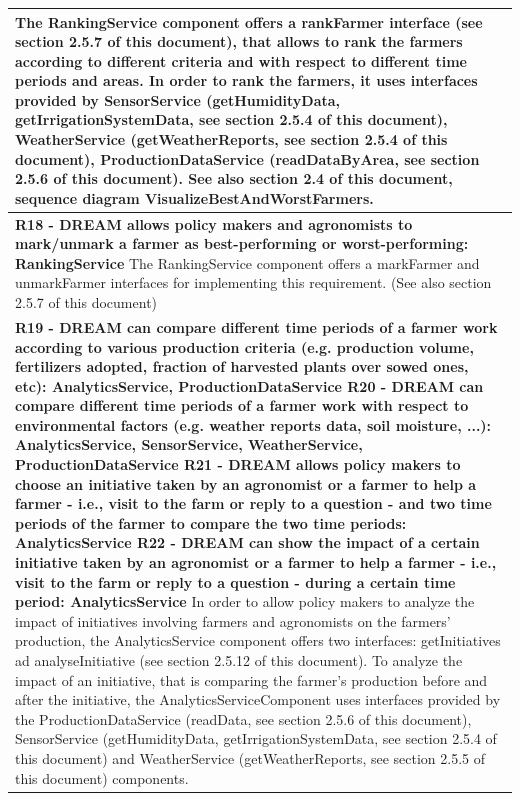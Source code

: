 \documentclass{article}
\begin{document}
\begin{longtable}[c]{|m{11.75cm}|}
    The RankingService component offers a rankFarmer interface (see section 2.5.7 of this document), that allows to rank the farmers according to different criteria and with respect to different time periods and areas. In order to rank the farmers, it uses interfaces provided by SensorService (getHumidityData, getIrrigationSystemData, see section 2.5.4 of this document), WeatherService (getWeatherReports, see section 2.5.4 of this document), ProductionDataService (readDataByArea, see section 2.5.6 of this document). See also section 2.4 of this document, sequence diagram VisualizeBestAndWorstFarmers.
    \\
    \hline
    
    \textbf{R18 - DREAM allows policy makers and agronomists to mark/unmark a farmer as best-performing or worst-performing: RankingService}
    \newline\newline
    The RankingService component offers a markFarmer and unmarkFarmer interfaces for implementing this requirement. (See also section 2.5.7 of this document)\\
    \hline
    
    \textbf{R19 - DREAM can compare different time periods of a farmer work according to various production criteria (e.g. production volume, fertilizers adopted, fraction of harvested plants over sowed ones, etc): AnalyticsService, ProductionDataService
    \newline\newline
    R20 - DREAM can compare different time periods of a farmer work with respect to environmental factors (e.g. weather reports data, soil moisture, ...): AnalyticsService, SensorService, WeatherService, ProductionDataService
    \newline\newline
    R21 - DREAM allows policy makers to choose an initiative taken by an agronomist or a farmer to help a farmer - i.e., visit to the farm or reply to a question - and two time periods of the farmer to compare the two time periods: AnalyticsService
    \newline\newline
    R22 - DREAM can show the impact of a certain initiative taken by an agronomist or a farmer to help a farmer - i.e., visit to the farm or reply to a question - during a certain time period: AnalyticsService
    \newline\newline}
    In order to allow policy makers to analyze the impact of initiatives involving farmers and agronomists on the farmers' production, the AnalyticsService component offers two interfaces: getInitiatives ad analyseInitiative (see section 2.5.12 of this document). To analyze the impact of an initiative, that is comparing the farmer's production before and after the initiative, the AnalyticsServiceComponent uses interfaces provided by the ProductionDataService (readData, see section 2.5.6 of this document), SensorService (getHumidityData, getIrrigationSystemData, see section 2.5.4 of this document) and WeatherService (getWeatherReports, see section 2.5.5 of this document) components.\\
    \hline
    

\end{longtable}
\end{document}
